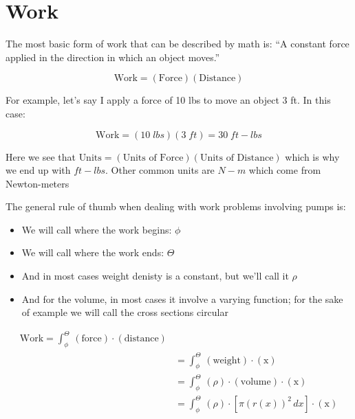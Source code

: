 \section{Work}

\noindent The most basic form of work that can be described by math is:
``A constant force applied in the direction in which an object moves.''

\begin{equation*}
  \text{Work} = (\text{Force})(\text{Distance})
\end{equation*}

\vspace{0.3in}

For example, let's say I apply a force of 10 lbs to move an object
3 ft. In this case:

\begin{equation*}
  \text{Work} = (10 \; lbs)(3 \; ft) = 30 \; ft-lbs
\end{equation*}


Here we see that $\text{Units}=(\text{Units of Force})(\text{Units of Distance})$
which is why we end up with $ft-lbs$. Other common units are $N-m$ which come 
from Newton-meters

\noindent The general rule of thumb when dealing with work problems involving pumps is:

\begin{framed}
  \begin{itemize} 
    \item We will call where the work begins: $\phi$
    \item We will call where the work ends: $\Theta$
    \item And in most cases weight denisty is a constant, but we'll call it $\rho$
    \item And for the volume, in most cases it involve a varying function;
              for the sake of example we will call the cross sections circular
  \end{itemize} 
\begin{align*}
  \text{Work} = \int_{\phi}^{\Theta}  \, (\text{force})\cdot(\text{distance})\\
  &= \int_{\phi}^{\Theta} \, (\text{weight})\cdot(\text{x})\\
  &= \int_{\phi}^{\Theta} \, (\rho)\cdot(\text{volume})\cdot(\text{x})\\
  &= \int_{\phi}^{\Theta} \, (\rho)\cdot[\pi(r(x))^2 \,dx]\cdot(\text{x})\\
\end{align*}
\end{framed}

